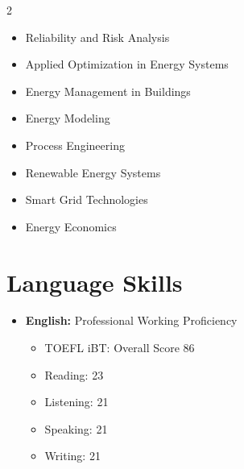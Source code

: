 \documentclass[letter,20pt]{article}
\begin{document}
\begin{multicols}{2}


\begin{itemize}
[
noitemsep,
topsep=3pt,
leftmargin=2ex
]


\item Reliability and Risk Analysis

\item Applied Optimization in Energy Systems

\item Energy Management in Buildings

\item Energy Modeling

\item Process Engineering

\item Renewable Energy Systems

\item Smart Grid Technologies

\item Energy Economics


\end{itemize}



\end{multicols}








\section{\textbf{Language Skills}}

\vspace{5pt}


\begin{itemize}
[
noitemsep,
leftmargin=3ex
]


\item
\textbf{English:}
Professional Working Proficiency


\begin{itemize}
[
noitemsep,
leftmargin=4ex
]

\item TOEFL iBT: Overall Score 86

\item Reading: 23

\item Listening: 21

\item Speaking: 21

\item Writing: 21

\end{itemize}


\end{itemize}
\end{document}
